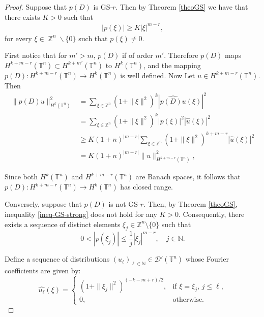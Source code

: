 \documentclass[11pt]{amsart}
\numberwithin{equation}{section}
\theoremstyle{definition}
\DeclareMathOperator{\Z}{\mathbb{Z}}
\begin{document}
		\begin{proof}
		Suppose that $p(D)$ is GS-$r$. Then by Theorem \ref{theoGS} we have that there exists $K>0$ such that
		\begin{align}\label{ineq-GS-strong}
			|p(\xi)|\geq K|\xi|^{m-r},
		\end{align}
		for every $\xi\in\Z^n\backslash\{0\}$ such that $p(\xi)\neq 0$.
		
		First notice that for $m'>m$, $p(D)$ if of order $m'$. Therefore $p(D)$ maps $H^{k + m - r}(\mathbb{T}^n)\subset H^{k+m'}(\mathbb{T}^n)$ to $H^k(\mathbb{T}^n)$, and the mapping \(p(D): H^{k + m - r}(\mathbb{T}^n) \to H^k(\mathbb{T}^n)\) is well defined. Now Let $ u \in H^{k + m - r}(\mathbb{T}^n) $. Then 
		\begin{align*}
			\|p(D)u\|_{H^k(\mathbb{T}^n)}^2 &= \sum_{\xi \in \mathbb{Z}^n} (1 + \|\xi\|^2)^k \left| \widehat{p(D)u}(\xi) \right|^2 \\
			&= \sum_{\xi \in \mathbb{Z}^n} (1 + \|\xi\|^2)^k |p(\xi)|^2 |\widehat{u}(\xi)|^2 \\
			&\geq K(1+n)^{|m-r|} \sum_{\xi \in \mathbb{Z}^n} (1 + \|\xi\|^2)^{k + m - r} |\widehat{u}(\xi)|^2 \\
			&= K(1+n)^{|m-r|} \|u\|_{H^{k + m - r}(\mathbb{T}^n)}^2,
		\end{align*}
		
		Since both $ H^k(\mathbb{T}^n) $ and $ H^{k + m - r}(\mathbb{T}^n) $ are Banach spaces, it follows that $ p(D):H^{k + m - r}(\mathbb{T}^n)\to H^k(\mathbb{T}^n)$ has closed range. 
		
		
	Conversely, suppose that $ p(D) $ is not GS-$ r $. Then, by Theorem \ref{theoGS}, inequality \eqref{ineq-GS-strong} does not hold for any $ K > 0 $. Consequently, there exists a sequence of distinct elements $ \xi_j \in \mathbb{Z}^n \setminus \{0\} $ such that
	\begin{equation}\label{ineq_contradiction_closed}
		0 < |p(\xi_j)| \leq \frac{1}{j} |\xi_j|^{m - r}, \quad  j \in \mathbb{N}.
	\end{equation}
	
	Define a sequence of distributions $ (u_\ell)_{\ell \in \mathbb{N}} \in \mathscr{D}'(\mathbb{T}^n) $ whose Fourier coefficients are given by:
	\[
	\widehat{u_\ell}(\xi) =
	\begin{cases}
		(1 + \|\xi_j\|^2)^{(-k - m + r)/2}, & \text{if } \xi = \xi_j, \, j \leq \ell, \\
		0, & \text{otherwise.}
	\end{cases}
	\]
	

\end{proof}
\end{document}
